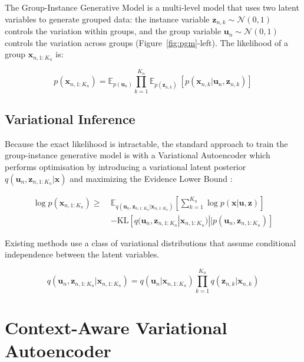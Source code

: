\documentclass{article} %
\begin{document}
The Group-Instance Generative Model \citep{Bouchacourt2018MultiLevelVA,Hosoya2019GroupbasedLO} is a multi-level model that uses two latent variables to generate grouped data: the instance variable $\mathbf{z}_{n,k} \sim \mathcal{N} (0,1)$ controls the variation within groups, and the group variable $\mathbf{u}_n \sim \mathcal{N} (0, 1)$ controls the variation across groups (Figure~\ref{fig:pgm}-left). The likelihood of a group $\mathbf{x}_{n,1:K_n}$ is:

\begin{equation}
p(\mathbf{x}_{n, 1:K_n}) = \mathbb{E}_{p(\mathbf{u}_n)}  \prod_{k=1}^{K_n} \mathbb{E}_{p(\mathbf{z}_{n,k})} ~ [p(\mathbf{x}_{n,k} | \mathbf{u}_n, \mathbf{z}_{n,k})]
\end{equation}

\subsection{Variational Inference}

Because the exact likelihood is intractable, the standard approach to train the group-instance generative model is with a Variational Autoencoder \citep{Kingma2014AutoEncodingVB,JimenezRezende2014StochasticBA} which performs optimisation by introducing a variational latent posterior $q(\mathbf{u}_n, \mathbf{z}_{n, 1:K_n} | \mathbf{x})$ and maximizing the Evidence Lower Bound \citep{Jordan2004AnIT}:

\begin{align}
\log p(\mathbf{x}_{n,1:K_n}) \geq ~ & \mathbb{E}_{q(\mathbf{u}_n, \mathbf{z}_{n, 1:K_n} | \mathbf{x}_{n, 1:K_n} )} \left[\sum_{k=1}^{K_n} \log p(\mathbf{x} | \mathbf{u}, \mathbf{z})\right] \\ &- \mathrm{KL} [q(\mathbf{u}_n, \mathbf{z}_{n, 1:K_n}  | \mathbf{x}_{n, 1:K_n} ) || p(\mathbf{u}_n, \mathbf{z}_{n, 1:K_n} )]
\end{align}

Existing methods use a class of variational distributions that assume conditional independence between the latent variables.

\begin{equation}
q(\mathbf{u}_n, \mathbf{z}_{n, 1:K_n}  | \mathbf{x}_{n, 1:K_n} ) = q(\mathbf{u}_n | \mathbf{x}_{n, 1:K_n} ) \prod_{k=1}^{K_n} q(\mathbf{z}_{n,k} | \mathbf{x}_{n,k})
\end{equation}

\section{Context-Aware Variational Autoencoder}
\end{document}
